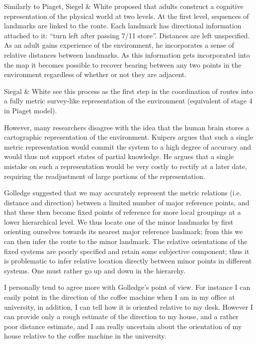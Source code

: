 Similarly to Piaget, Siegel \& White \cite{psycho_siegel75} proposed
that adults construct a cognitive representation of the physical world
at two levels. At the first level, sequences of landmarks are linked
to the route. Each landmark has directional information attached to
it: ``turn left after passing 7/11 store''. Distances are left
unspecified. As an adult gains experience of the environment, he
incorporates a sense of relative distances between landmarks. As this
information gets incorporated into the map it becomes possible to
recover bearing between any two points in the environment regardless
of whether or not they are adjacent.

Siegal \& White \cite{psycho_siegel75} see this process as the first
step in the coordination of routes into a fully metric survey-like
representation of the environment (equivalent of stage 4 in Piaget model).

However, many researchers disagree with the idea that the human brain
stores a cartographic representation of the environment. Kuipers
\cite{psycho_kuipers82} argues that such a single metric
representation would commit the system to a high degree of accuracy
and would thus not support states of partial knowledge. He argues that
a single mistake on such a representation would be very costly to
rectify at a later date, requiring the readjustment of large portions
of the representation.

Golledge \cite{psycho_golledge87} suggested that we may accurately
represent the metric relations (i.e. distance and direction) between a
limited number of major reference points, and that these then become
fixed points of reference for more local groupings at a lower
hierarchical level. We thus locate one of the minor landmarks by first
orienting ourselves towards its nearest major reference landmark; from
this we can then infer the route to the minor landmark. The relative
orientations of the fixed systems are poorly specified and retain some
subjective component; thus it is problematic to infer relative
location directly between minor points in different systems. One must
rather go up and down in the hierarchy.

I personally tend to agree more with Golledge's point of view. For
instance I can easily point in the direction of the coffee machine
when I am in my office at university, in addition, I can tell how it
is oriented relative to my desk.  However I can provide only a rough
estimate of the direction to my house, and a rather poor distance
estimate, and I am really uncertain about the orientation of my house
relative to the coffee machine in the university. 

